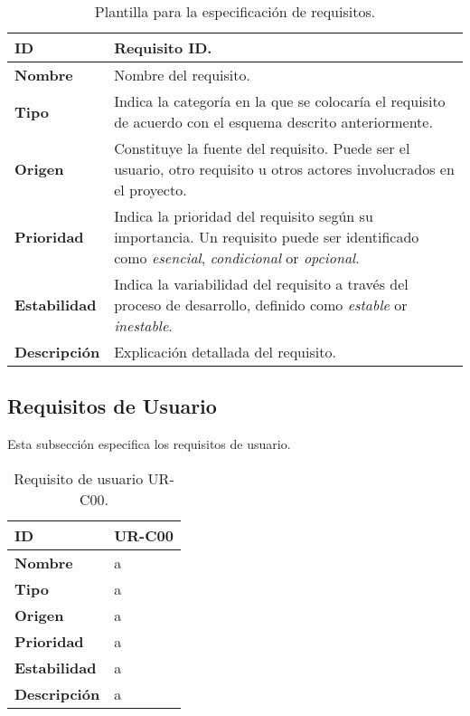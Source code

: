 \begin{center}
\begin{table*}[htbp]
\centering
\begin{tabular}{@{}p{2.5cm} p{9cm}@{}} 
\toprule
\textbf{ID} 				& Requisito ID. \\
\midrule
\textbf{Nombre} 			& Nombre del requisito. \\
\midrule
\textbf{Tipo} 			& Indica la categoría en la que se colocaría el requisito de acuerdo con el esquema descrito anteriormente. \\
\midrule
\textbf{Origen} 			& Constituye la fuente del requisito. Puede ser el usuario, otro requisito u otros actores involucrados en el proyecto. \\
\midrule
\textbf{Prioridad}		& Indica la prioridad del requisito según su importancia. Un requisito puede ser identificado como \textit{esencial}, \textit{condicional} or \textit{opcional}. \\
\midrule
\textbf{Estabilidad} 		& Indica la variabilidad del requisito a través del proceso de desarrollo, definido como \textit{estable} or \textit{inestable}. \\
\midrule
\textbf{Descripción} 	& Explicación detallada del requisito. \\
\bottomrule
\end{tabular}
\caption{Plantilla para la especificación de requisitos.}
\label{tab:requirements_template}
\end{table*}
\end{center}

\subsection{Requisitos de Usuario}

Esta subsección especifica los requisitos de usuario.

\begin{center}
\begin{table*}[htbp]
\centering
\begin{tabular}{@{}p{2.5cm} p{9cm}@{}} 
\toprule
\textbf{ID} 				& UR-C00 \\
\midrule
\textbf{Nombre} 			& a \\
\midrule
\textbf{Tipo} 			& a \\
\midrule
\textbf{Origen} 			& a \\
\midrule
\textbf{Prioridad}		& a \\
\midrule
\textbf{Estabilidad} 		& a \\
\midrule
\textbf{Descripción} 	& a \\
\bottomrule
\end{tabular}
\caption{Requisito de usuario UR-C00.}
\label{tab:urc00}
\end{table*}
\end{center}

